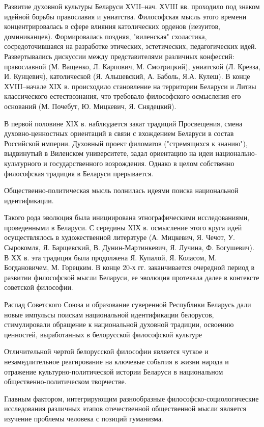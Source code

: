 Развитие духовной культуры Беларуси ХVII–нач. ХVIII вв. проходило под знаком идейной борьбы православия и униатства. Философская мысль этого времени концентрировалась в сфере влияния католических орденов (иезуитов, доминиканцев). Формировалась поздняя, "виленская" схоластика, сосредоточившаяся на разработке этических, эстетических, педагогических идей. Развертывались дискуссии между представителями различных конфессий: православной (М. Ващенко, Л. Карпович, М. Смотрицкий), униатской (Л. Кревза, И. Кунцевич), католической (Я. Альшевский, А. Баболь, Я.А. Кулеш). В конце ХVIII–начале ХIХ в. происходило становление на территории Беларуси и Литвы классического естествознания, что требовало философского осмысления его оснований (М. Почебут, Ю. Мицкевич, Я. Снядецкий).

В первой половине ХIХ в. наблюдается закат традиций Просвещения, смена духовно-ценностных ориентаций в связи с вхождением Беларуси в состав Российской империи. Духовный проект филоматов ("стремящихся к знанию"), выдвинутый в Виленском университете, задал ориентацию на идеи национально-культурного и государственного возрождения. Однако в целом собственно философская традиция в Беларуси прерывается.

Общественно-политическая мысль полнилась идеями поиска национальной идентификации.

Такого рода эволюция была инициирована этнографическими исследованиями, проведенными в Беларуси. С середины ХIХ в. осмысление этого круга идей осуществлялось в художественной литературе (А. Мицкевич, Я. Чечот, У. Сырокомля, Я. Барщевский, В. Дунин-Мартинкевич, Я. Лучина, Ф. Богушевич). В ХХ в. эта традиция была продолжена Я. Купалой, Я. Коласом, М. Богдановичем, М. Горецким. В конце 20-х гг. заканчивается очередной период в развитии философской мысли Беларуси, ее эволюция протекала далее в контексте советской философии.

Распад Советского Союза и образование суверенной Республики Беларусь дали новые импульсы поискам национальной идентификации белорусов, стимулировали обращение к национальной духовной традиции, освоению ценностей, выработанных в белорусской философской культуре

Отличительной чертой белорусской философии является чуткое и незамедлительное реагирование на ключевые события в жизни народа и отражение культурно-политической истории Беларуси в национальном общественно-политическом творчестве.

Главным фактором, интегрирующим разнообразные философско-социологические исследования различных этапов отечественной общественной мысли является изучение проблемы человека с позиций гуманизма.



